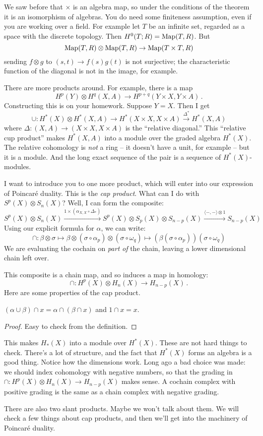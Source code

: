 We saw before that $\times$ is an algebra map, so under the conditions of the
theorem it is an isomorphism of algebras. You do need some finiteness 
assumption, even if you are working over a field. For example let $T$ be an
infinite set, regarded as a space with the discrete topology. Then 
$H^0(T;R)=\operatorname{Map}(T,R)$. But
\[
\operatorname{Map}(T,R)\otimes\operatorname{Map}(T,R)\to\operatorname{Map}(T\times T,R)
\]
sending $f\otimes g$ to $(s,t)\to f(s)g(t)$ is not surjective; the 
characteristic function of the diagonal is not in the image, for example. 

There are more products around. For example, there is a map 
\[
H^p(Y)\otimes H^q(X,A)\to H^{p+q}(Y\times X,Y\times A)\,.
\]
Constructing this is on your homework. Suppose $Y=X$. 
Then I get 
\[
\cup: H^\ast(X)\otimes H^\ast(X,A)\to H^\ast(X\times X,X\times A)\xrightarrow{\Delta^\ast} H^\ast(X,A)
\]
where $\Delta:(X,A)\to (X\times X,X\times A)$ is the ``relative diagonal.'' 
This ``relative cup product'' makes $ H^\ast(X,A)$ into a module over the graded algebra $ H^\ast(X)$. The relative cohomology is \emph{not} a ring -- it doesn't have a unit, for example -- but it is a module. And the long exact sequence of the pair is a sequence of $ H^\ast(X)$-modules. 

I want to introduce you to one more product, which will enter into our
expression of Poincar\'{e} duality. This is the {\em cap product}.
What can I do with $S^p(X)\otimes S_n(X)$? Well, I can form the composite:
\begin{equation*}
S^p(X)\otimes S_n(X)\xrightarrow{1\times (\alpha_{X,X}\circ \Delta_\ast)} S^p(X)\otimes S_p(X)\otimes S_{n-p}(X)\xrightarrow{\langle -,-\rangle\otimes 1}S_{n-p}(X)
\end{equation*}
Using our explicit formula for $\alpha$, we can write:
\begin{equation*}
\cap:\beta\otimes\sigma\mapsto\beta\otimes(\sigma\circ\alpha_p)\otimes(\sigma\circ\omega_q)\mapsto\left(\beta(\sigma\circ\alpha_p)\right) (\sigma\circ\omega_q)
\end{equation*}
We are evaluating the cochain on {\em part of} the chain, leaving a lower 
dimensional chain left over.

This composite is a chain map, and so induces a map in homology:
\[
\cap:H^p(X)\otimes H_n(X)\to H_{n-p}(X)\,.
\]
Here are some properties of the cap product.
\begin{lemma}
$(\alpha\cup\beta)\cap x=\alpha\cap(\beta\cap x)$ and $1\cap x=x$.
\end{lemma}
\begin{proof}
Easy to check from the definition.
\end{proof}
This makes $ H_\ast(X)$ into a module over $ H^\ast(X)$. These are not hard things to check. There's a lot of structure, and the fact that $ H^\ast(X)$ forms an algebra is a good thing. Notice how the dimensions work. Long ago a bad choice was made: we should index cohomology with negative numbers, so that the grading in $\cap: H^p(X)\otimes H_n(X)\to H_{n-p}(X)$ makes sense. A cochain complex with positive grading is the same as a chain complex with negative grading.

There are also two slant products. Maybe we won't talk about them. We will check a few things about cap products, and then we'll get into the machinery of Poincar\'{e} duality.
